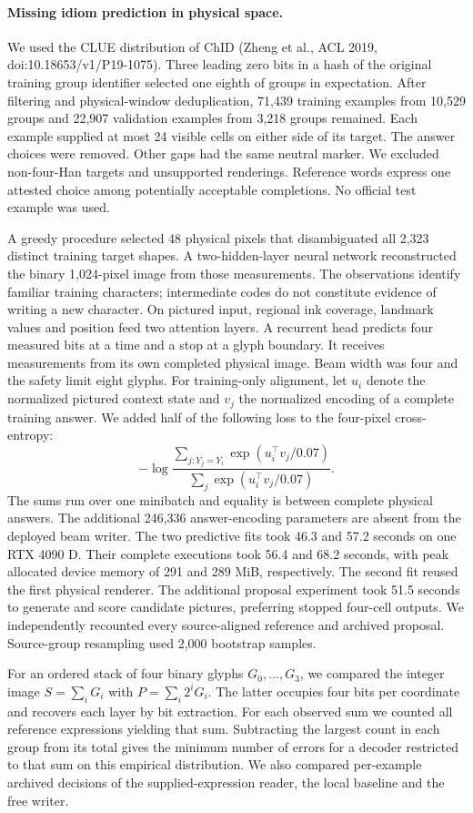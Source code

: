 \paragraph{Missing idiom prediction in physical space.}
We used the CLUE distribution of ChID (Zheng et al., ACL 2019,
doi:10.18653/v1/P19-1075). Three leading zero bits in a hash of the
original training group identifier selected one eighth of groups in
expectation. After filtering and physical-window deduplication, 71,439
training examples from 10,529 groups and 22,907 validation examples
from 3,218 groups remained. Each example supplied at most 24 visible
cells on either side of its target. The answer choices were removed.
Other gaps had the same neutral marker. We excluded non-four-Han targets
and unsupported renderings. Reference words express one attested choice
among potentially acceptable completions. No official test example was used.

A greedy procedure selected 48 physical pixels that disambiguated all 2,323
distinct training target shapes. A two-hidden-layer neural network
reconstructed the binary 1,024-pixel image from those measurements.
The observations identify familiar training characters; intermediate codes
do not constitute evidence of writing a new character. On pictured input,
regional ink coverage, landmark values and position feed two attention
layers. A recurrent head predicts four measured bits at a time and a stop
at a glyph boundary. It receives measurements from its own completed
physical image. Beam width was four and the safety limit eight glyphs.
For training-only alignment, let $u_i$ denote the normalized pictured
context state and $v_j$ the normalized encoding of a complete training
answer. We added half of the following loss to the four-pixel
cross-entropy:
\[
-\log\frac{\sum_{j:Y_j=Y_i}\exp(u_i^\top v_j/0.07)}
               {\sum_j\exp(u_i^\top v_j/0.07)}.
\]
The sums run over one minibatch and equality is between complete physical
answers. The additional 246,336 answer-encoding parameters are absent
from the deployed beam writer. The two predictive fits took 46.3 and
57.2 seconds on one RTX 4090 D. Their complete executions took 56.4 and
68.2 seconds, with peak allocated device memory of 291 and 289 MiB,
respectively. The second fit reused the first physical renderer.
The additional proposal experiment took 51.5 seconds to generate and
score candidate pictures, preferring stopped four-cell outputs. We
independently recounted every source-aligned reference and archived
proposal. Source-group resampling used 2,000 bootstrap samples.

For an ordered stack of four binary glyphs $G_0,\ldots,G_3$, we compared
the integer image $S=\sum_i G_i$ with $P=\sum_i2^iG_i$. The latter
occupies four bits per coordinate and recovers each layer by bit extraction.
For each observed sum we counted all reference expressions yielding that
sum. Subtracting the largest count in each group from its total gives the
minimum number of errors for a decoder restricted to that sum on this
empirical distribution. We also compared per-example archived decisions
of the supplied-expression reader, the local baseline and the free writer.
